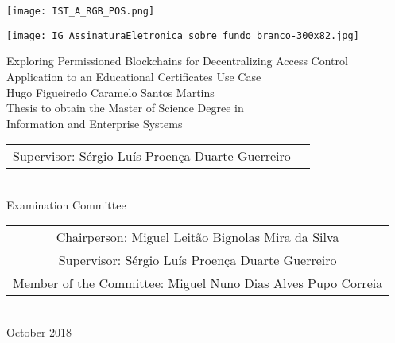 \texttt{[image: IST\_A\_RGB\_POS.png]}

\hspace*{9.5cm}\texttt{[image: IG\_AssinaturaEletronica\_sobre\_fundo\_branco-300x82.jpg]}

\begin{center}
    \vspace{5cm}
    {\FontLb Exploring Permissioned Blockchains for Decentralizing Access Control} \\
    \vspace{0.3cm}
    {\FontMn Application to an Educational Certificates Use Case} \\
    \vspace{1.5cm}  
    {\FontMb Hugo Figueiredo Caramelo Santos Martins} \\
    \vspace{1.5cm}
    {\FontSn Thesis to obtain the Master of Science Degree in} \\
    \vspace{0.3cm}
    {\FontLb Information and Enterprise Systems} \\
    \vspace{1.5cm}
    {\FontSn %
        \begin{tabular}{ll}
            Supervisor: Sérgio Luís Proença Duarte Guerreiro
        \end{tabular} } \\
    \vspace{1.5cm}
    {\FontMb Examination Committee} \\
    \vspace{0.3cm}
    {\FontSn %
        \begin{tabular}{c}
            Chairperson: Miguel Leitão Bignolas Mira da Silva  \\ 
            Supervisor: Sérgio Luís Proença Duarte Guerreiro \\ 
            Member of the Committee: Miguel Nuno Dias Alves Pupo Correia
        \end{tabular} } \\
    \vspace*{\fill}
    {\FontMb October 2018}
\end{center}